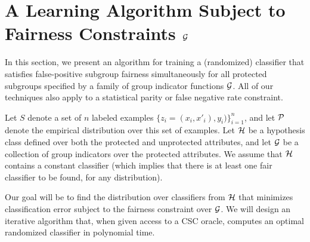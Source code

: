 \section{A Learning Algorithm Subject to Fairness Constraints $\mathcal{G}$}
\label{sec:learning}

In this section, we present an algorithm for training a (randomized)
classifier that satisfies false-positive subgroup fairness
simultaneously for all protected subgroups specified by a family of
group indicator functions $\mathcal{G}$. All of our techniques also apply to a
statistical parity or false negative rate constraint.



Let $S$ denote a set of $n$ labeled examples
$\{z_i = (x_i, x'_i), y_i)\}_{i=1}^n$, and let $\mathcal{P}$ denote the
empirical distribution over this set of examples.  Let $\mathcal{H}$ be a
hypothesis class defined over both the protected and unprotected
attributes, and let $\mathcal{G}$ be a collection of group indicators over the
protected attributes. We assume that $\mathcal{H}$ contains a constant
classifier (which implies that there is at least one fair classifier
to be found, for any distribution).




Our goal will be to find the distribution over classifiers from $\mathcal{H}$
that minimizes classification error subject to the fairness constraint
over $\mathcal{G}$. We will design an iterative algorithm that, when given
access to a CSC oracle, computes an optimal randomized classifier in
polynomial time.

